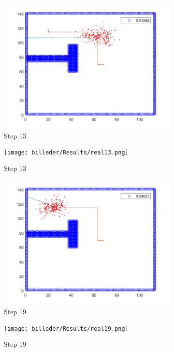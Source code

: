 \begin{figure}[H]
\centering
\begin{subfigure}{.5\textwidth}
  \centering
  \includegraphics[width=.8\linewidth]{billeder/Results/13.png}
  \caption{Step 13}
  \label{ResultDriveFig3:sub1}
\end{subfigure}%
\begin{subfigure}{.5\textwidth}
  \centering
  \texttt{[image: billeder/Results/real13.png]}
  \caption{Step 13}
  \label{ResultDriveFig3:sub2}
\end{subfigure}
\begin{subfigure}{.5\textwidth}
  \centering
  \includegraphics[width=.8\linewidth]{billeder/Results/19.png}
  \caption{Step 19}
  \label{ResultDriveFig3:sub3}
\end{subfigure}%
\begin{subfigure}{.5\textwidth}
  \centering
  \texttt{[image: billeder/Results/real19.png]}
  \caption{Step 19}
  \label{ResultDriveFig3:sub4}
\end{subfigure}
\begin{subfigure}{.5\textwidth}

\end{subfigure}
\end{figure}
